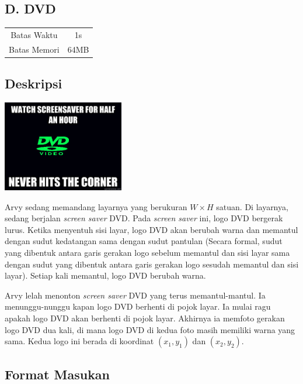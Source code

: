 \documentclass{article}
\begin{document}
\begin{center}
    \section*{D. DVD} %

    \begin{tabular}{ | c c | }
        \hline
        Batas Waktu  & 1s \\    %
        Batas Memori & 64MB \\  %
        \hline
    \end{tabular}
\end{center}

\subsection*{Deskripsi}

\begin{center}
    \includegraphics[width=200px]{meme}
\end{center}

Arvy sedang memandang layarnya yang berukuran $W \times H$ satuan.
Di layarnya, sedang berjalan \textit{screen saver} DVD.
Pada \textit{screen saver} ini, logo DVD bergerak lurus.
Ketika menyentuh sisi layar, logo DVD akan berubah warna dan memantul dengan sudut kedatangan sama dengan sudut pantulan (Secara formal, sudut yang dibentuk antara garis gerakan logo sebelum memantul dan sisi layar sama dengan sudut yang dibentuk antara garis gerakan logo sesudah memantul dan sisi layar).
Setiap kali memantul, logo DVD berubah warna.

Arvy lelah menonton \textit{screen saver} DVD yang terus memantul-mantul.
Ia menunggu-nunggu kapan logo DVD berhenti di pojok layar.
Ia mulai ragu apakah logo DVD akan berhenti di pojok layar.
Akhirnya ia memfoto gerakan logo DVD dua kali, di mana logo DVD di kedua foto masih memiliki warna yang sama. Kedua logo ini berada di koordinat $(x_1, y_1)$ dan $(x_2, y_2)$.

\subsection*{Format Masukan}
\end{document}
